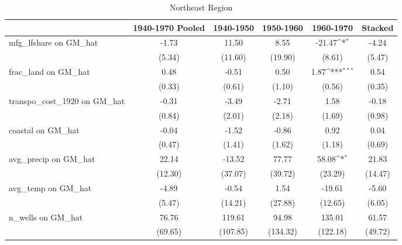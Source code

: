 \begin{table}[htbp]\centering
\def\sym#1{\ifmmode^{#1}\else\(^{#1}\)\fi}
\caption{Northeast Region}
\begin{tabular}{l*{5}{c}}
\toprule
                &\multicolumn{1}{c}{1940-1970 Pooled}&\multicolumn{1}{c}{1940-1950}&\multicolumn{1}{c}{1950-1960}&\multicolumn{1}{c}{1960-1970}&\multicolumn{1}{c}{Stacked}\\
\midrule
mfg\_lfshare on GM\_hat&    -1.73         &    11.50         &     8.55         &   -21.47\sym{*}  &    -4.24         \\
                &   (5.34)         &  (11.60)         &  (19.90)         &   (8.61)         &   (5.47)         \\
\addlinespace
frac\_land on GM\_hat&     0.48         &    -0.51         &     0.50         &     1.87\sym{***}&     0.54         \\
                &   (0.33)         &   (0.61)         &   (1.10)         &   (0.56)         &   (0.35)         \\
\addlinespace
transpo\_cost\_1920 on GM\_hat&    -0.31         &    -3.49         &    -2.71         &     1.58         &    -0.18         \\
                &   (0.84)         &   (2.01)         &   (2.18)         &   (1.69)         &   (0.98)         \\
\addlinespace
coastal on GM\_hat&    -0.04         &    -1.52         &    -0.86         &     0.92         &     0.04         \\
                &   (0.47)         &   (1.41)         &   (1.62)         &   (1.18)         &   (0.69)         \\
\addlinespace
avg\_precip on GM\_hat&    22.14         &   -13.52         &    77.77         &    58.08\sym{*}  &    21.83         \\
                &  (12.30)         &  (37.07)         &  (39.72)         &  (23.29)         &  (14.47)         \\
\addlinespace
avg\_temp on GM\_hat&    -4.89         &    -0.54         &     1.54         &   -19.61         &    -5.60         \\
                &   (5.47)         &  (14.21)         &  (27.88)         &  (12.65)         &   (6.05)         \\
\addlinespace
n\_wells on GM\_hat&    76.76         &   119.61         &    94.98         &   135.01         &    61.57         \\
                &  (69.65)         & (107.85)         & (134.32)         & (122.18)         &  (49.72)         \\

\end{tabular}
\end{table}
